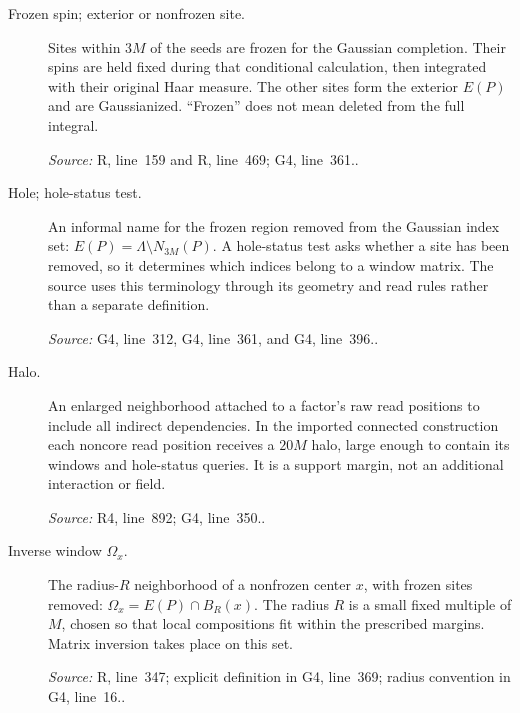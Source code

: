 \documentclass[11pt]{article}
\newcommand{\src}[2]{\textsf{#1}, line~#2}
\newcommand{\where}[1]{\par{\small\textit{Source:} #1.}}
\begin{document}
\begin{description}
\item[Frozen spin; exterior or nonfrozen site.]
Sites within \(3M\) of the seeds are frozen for the Gaussian
completion.  Their spins are held fixed during that conditional
calculation, then integrated with their original Haar measure.
The other sites form the exterior \(E(P)\) and are Gaussianized.
``Frozen'' does not mean deleted from the full integral.
\where{\src{R}{159} and \src{R}{469}; \src{G4}{361}.}

\item[Hole; hole-status test.]
An informal name for the frozen region removed from the Gaussian
index set: \(E(P)=\Lambda\setminus N_{3M}(P)\).  A hole-status test
asks whether a site has been removed, so it determines which indices
belong to a window matrix.  The source uses this terminology through
its geometry and read rules rather than a separate definition.
\where{\src{G4}{312}, \src{G4}{361}, and \src{G4}{396}.}

\item[Halo.]
An enlarged neighborhood attached to a factor's raw read positions
to include all indirect dependencies.  In the imported connected
construction each noncore read position receives a \(20M\) halo,
large enough to contain its windows and hole-status queries.
It is a support margin, not an additional interaction or field.
\where{\src{R4}{892}; \src{G4}{350}.}

\item[Inverse window \(\Omega_x\).]
The radius-\(R\) neighborhood of a nonfrozen center \(x\), with
frozen sites removed:
\(\Omega_x=E(P)\cap B_R(x)\).  The radius \(R\) is a small
fixed multiple of \(M\), chosen so that local compositions fit within
the prescribed margins.  Matrix inversion takes place on this set.
\where{\src{R}{347}; explicit definition in \src{G4}{369};
radius convention in \src{G4}{16}.}
\end{description}
\end{document}

